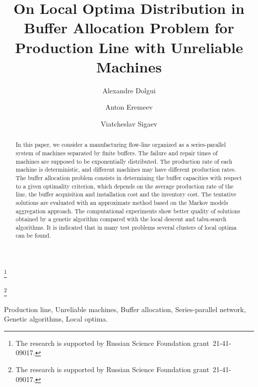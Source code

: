 \documentclass{ifacconf}
\begin{document}
\begin{frontmatter}

\title{On Local Optima Distribution in Buffer Allocation Problem for Production Line with Unreliable Machines} 

\thanks[footnoteinfo]{The research is supported by Russian Science Foundation  grant~21-41-09017.}


\thanks[footnoteinfo]{The research is supported by Russian Science Foundation  grant~21-41-09017.}

\author[First]{Alexandre Dolgui} 
\author[Second]{Anton Eremeev} 
\author[Third]{Viatcheslav Sigaev}

\address[First]{IMT Atlantique, Nantes, France}
\address[Second]{Sobolev Institute of Mathematics SB RAS, Novosibirsk, Russia (e-mail: eremeev@ofim.oscsbras.ru).}
\address[Third]{Avtomatika-Servis LLC, Omsk, Russia (e-mail: sigvs@yandex.ru).}


\begin{abstract}                %
In this paper, we consider a manufacturing flow-line
organized as a series-parallel system of machines separated by
finite buffers. The failure and repair times of machines are
supposed to be exponentially distributed. The production rate of
each machine is deterministic, and different machines may have
different production rates. The buffer allocation problem consists
in determining the buffer capacities with respect to a given
optimality criterion, which depends on the average production rate
of the line, the buffer acquisition and installation cost and the
inventory cost. The tentative solutions are evaluated with an
approximate method based on the Markov models aggregation
approach. The computational experiments show better quality of
solutions obtained by a genetic algorithm compared with the local
descent and tabu-search algorithms. It is indicated that in many
test problems several clusters of local optima can be found.
\end{abstract}

\begin{keyword}
Production line, Unreliable machines, Buffer allocation, Series-parallel network, Genetic algorithms, Local optima.
\end{keyword}

\end{frontmatter}
\end{document}
